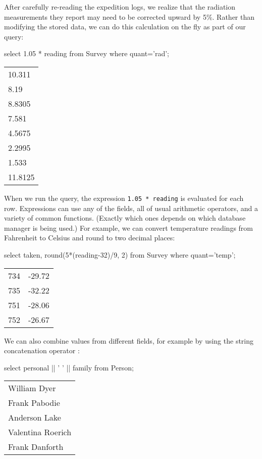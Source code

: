 \documentclass{book}
\begin{document}
After carefully re-reading the expedition logs, we realize that the
radiation measurements they report may need to be corrected upward by
5\%. Rather than modifying the stored data, we can do this calculation
on the fly as part of our query:

\begin{VerbIn}
\end{VerbIn}

\begin{VerbIn}
select 1.05 * reading from Survey where quant='rad';
\end{VerbIn}

\begin{tabular}{l}
10.311 \\
8.19 \\
8.8305 \\
7.581 \\
4.5675 \\
2.2995 \\
1.533 \\
11.8125 \\
\end{tabular}

When we run the query, the expression \texttt{1.05 * reading} is
evaluated for each row. Expressions can use any of the fields, all of
usual arithmetic operators, and a variety of common functions. (Exactly
which ones depends on which database manager is being used.) For
example, we can convert temperature readings from Fahrenheit to Celsius
and round to two decimal places:

\begin{VerbIn}
select taken, round(5*(reading-32)/9, 2) from Survey where quant='temp';
\end{VerbIn}

\begin{tabular}{ll}
734 & -29.72 \\
735 & -32.22 \\
751 & -28.06 \\
752 & -26.67 \\
\end{tabular}

We can also combine values from different fields, for example by using
the string concatenation operator \texttt{\textbar{}\textbar{}}:

\begin{VerbIn}
select personal || ' ' || family from Person;
\end{VerbIn}

\begin{tabular}{l}
William Dyer \\
Frank Pabodie \\
Anderson Lake \\
Valentina Roerich \\
Frank Danforth \\
\end{tabular}
\end{document}
